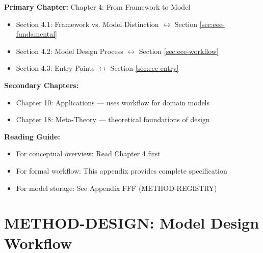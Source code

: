 \begin{tcolorbox}[colback=purple!5!white, colframe=purple!75!black,
    title=Chapter Linkage]

\textbf{Primary Chapter:} Chapter 4: From Framework to Model
\begin{itemize}[nosep]
\item Section 4.1: Framework vs. Model Distinction $\leftrightarrow$ Section \ref{sec:eee-fundamental}
\item Section 4.2: Model Design Process $\leftrightarrow$ Section \ref{sec:eee-workflow}
\item Section 4.3: Entry Points $\leftrightarrow$ Section \ref{sec:eee-entry}
\end{itemize}

\textbf{Secondary Chapters:}
\begin{itemize}[nosep]
\item Chapter 10: Applications --- uses workflow for domain models
\item Chapter 18: Meta-Theory --- theoretical foundations of design
\end{itemize}

\textbf{Reading Guide:}
\begin{itemize}[nosep]
\item For conceptual overview: Read Chapter 4 first
\item For formal workflow: This appendix provides complete specification
\item For model storage: See Appendix FFF (METHOD-REGISTRY)
\end{itemize}

\end{tcolorbox}

\chapter{METHOD-DESIGN: Model Design Workflow}
\label{app:method-design}

\begin{abstract}
This appendix defines the systematic workflow for designing testable behavioral
models from the Evidence-Based Framework (EBF). The workflow supports two entry
points---theory-driven and practice-driven (Gestaltungsanlass)---which converge
through iterative Scope-Context specification. Central to the workflow is the
3+1 Choice Architecture (Axiom MD-1), which provides three curated options plus
one self-defined option at each decision point. Options are drawn from the Model
Registry (Appendix FFF) via similarity search (Axiom MD-2).
\end{abstract}

